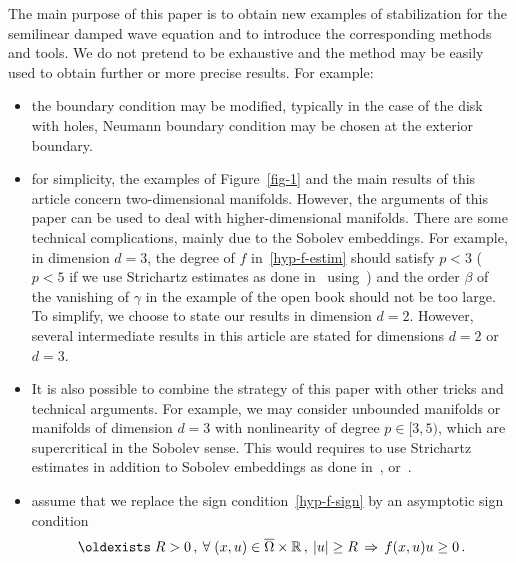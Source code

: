 \documentclass[AHL,Unicode,longabstracts]{cedram}
\newcommand{\RR}{\mathbb{R}}
\renewcommand*{\exists}{\mathrel{\oldexists}}
\let\oldforall\forall
\renewcommand*{\forall}{\mathrel{\oldforall}}
\begin{document}
The main purpose of this paper is to obtain new examples of stabilization for the semilinear damped wave equation and to introduce the corresponding methods and tools. We do not pretend to be exhaustive and the method may be easily used to obtain further or more precise results. For example:
\begin{itemize}
\item the boundary condition may be modified, typically in the case of the disk with holes, Neumann boundary condition may be chosen at the exterior boundary.
\item for simplicity, the examples of Figure~\ref{fig-1} and the main results of this article concern two-dimensional manifolds. However, the arguments of this paper can be used to deal with higher-dimensional manifolds. There are some technical complications, mainly due to the Sobolev embeddings. For example, in dimension $d=3$, the degree of $f$ in~\eqref{hyp-f-estim} should satisfy $p<3$ ($p<5$ if we use Strichartz estimates as done in~\cite{RC} using~\cite{DLZ}) and the order $\beta$ of the vanishing of $\gamma$ in the example of the open book should not be too large. To simplify, we choose to state our results in dimension $d=2$. However, several intermediate results in this article are stated for dimensions $d=2$ or $d=3$.
\item It is also possible to combine the strategy of this paper with other tricks and technical arguments. For example, we may consider unbounded manifolds or manifolds of dimension $d=3$ with nonlinearity of degree $p\in [3,5)$, which are supercritical in the Sobolev sense. This would requires to use Strichartz estimates in addition to Sobolev embeddings as done in~\cite{Dehman}, \cite{DLZ} or~\cite{RC}.
\item assume that we replace the sign condition~\eqref{hyp-f-sign} by an asymptotic sign condition
\[
\exists R>0\,,\:\forall (x,u)\in
\overline\Omega\times\RR\,,\:|u|\geq R\,\Rightarrow\,f(x,u)u\geq 0\,.
\]

\end{itemize}
\end{document}
